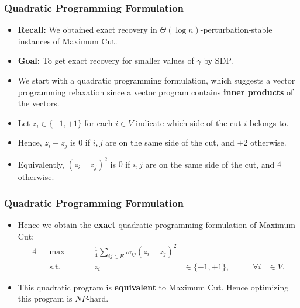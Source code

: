\documentclass{beamer}
\begin{document}
    \begin{frame}
        \frametitle{Quadratic Programming Formulation}
    
        \begin{itemize}
            \item {\bf Recall:} We obtained exact recovery in $\Theta(\log n)$-perturbation-stable instances of {\sc Maximum Cut}. \pause
            \item {\bf Goal:} To get exact recovery for smaller values of $\gamma$ by SDP. \pause
            \item We start with a quadratic programming formulation, which suggests a vector programming relaxation since a vector program contains {\bf inner products} of the vectors. \pause
            \item Let $z_i \in \{ -1, +1 \}$ for each $i \in V$ indicate which side of the cut $i$ belongs to. \pause
            \item Hence, $z_i - z_j$ is $0$ if $i, j$ are on the same side of the cut, and $\pm 2$ otherwise. \pause
            \item Equivalently, $(z_i - z_j)^2$ is $0$ if $i, j$ are on the same side of the cut, and $4$ otherwise.
        \end{itemize}
    \end{frame}

    \begin{frame}
        \frametitle{Quadratic Programming Formulation}
    
        \begin{itemize}
            \item Hence we obtain the {\bf exact} quadratic programming formulation of {\sc Maximum Cut}:
            \begin{alignat*}{4}
                && \max \qquad && \frac{1}{4} \sum_{ij \in E} w_{ij} (z_i - z_j)^2 \\
                && \text{s.t.} \qquad && z_i & \in \{ -1, +1 \}, & \qquad \forall i & \in V.
              \end{alignat*}
              \pause
              \item This quadratic program is {\bf equivalent} to {\sc Maximum Cut}. Hence optimizing this program is $NP$-hard.
        \end{itemize}
    \end{frame}
\end{document}
